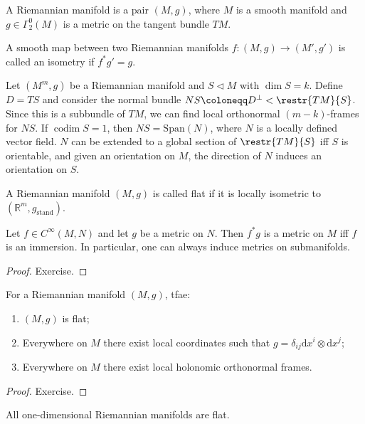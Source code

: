 \documentclass[english,letterpaper]{article}%
\numberwithin{equation}{section}
\numberwithin{figure}{section}
\numberwithin{table}{section}
\theoremstyle{definition}
\theoremstyle{definition}
\theoremstyle{definition}
\theoremstyle{plain}
\theoremstyle{plain}
\theoremstyle{plain}
\theoremstyle{plain}
\theoremstyle{remark}
\theoremstyle{remark}
\newcommand{\dd}{{\mathrm{d}}}
\DeclareMathOperator{\codim}{codim}
\newcommand{\sub}{\vartriangleleft}
\begin{document}
\begin{defn}
A Riemannian manifold is a pair $(M,g)$, where $M$ is a smooth manifold and $g\in\Gamma^0_2(M)$ is a metric on the tangent bundle $TM$.
\end{defn}

\begin{defn}[Isometry]
A smooth map between two Riemannian manifolds $f:(M,g)\to(M',g')$ is called an isometry if $f^\ast g'=g$.
\end{defn}

\begin{cor}
Let $(M^m,g)$ be a Riemannian manifold and $S\sub M$ with $\dim S=k$. Define $D=TS$ and consider the normal bundle $NS\coloneqq D^\perp<\restr{TM}{S}$. Since this is a subbundle of $TM$, we can find local orthonormal $(m-k)$-frames for $NS$. If $\codim S=1$, then $NS=\mathrm{Span}(N)$, where $N$ is a locally defined vector field. $N$ can be extended to a global section of $\restr{TM}{S}$ iff $S$ is orientable, and given an orientation on $M$, the direction of $N$ induces an orientation on $S$.
\end{cor}


\begin{defn}
A Riemannian manifold $(M,g)$ is called flat if it is locally isometric to $(\mathbb{R}^m,g_{\text{stand}})$.
\end{defn}


\begin{thm}
Let $f\in C^\infty(M,N)$ and let $g$ be a metric on $N$. Then $f^\ast g$ is a metric on $M$ iff $f$ is an immersion. In particular, one can always induce metrics on submanifolds.
\end{thm}
\begin{proof}
Exercise.
\end{proof}

\begin{thm}
For a Riemannian manifold $(M,g)$,  \gls{tfae}:
\begin{enumerate}
    \item $(M,g)$ is flat;
    \item Everywhere on $M$ there exist local coordinates such that $g=\delta_{ij} \dd x^i\otimes \dd x^j$;
    \item Everywhere on $M$ there exist local holonomic orthonormal frames.
\end{enumerate}
\end{thm}
\begin{proof}
Exercise.
\end{proof}
\begin{cor}
All one-dimensional Riemannian manifolds are flat.
\end{cor}
\end{document}
